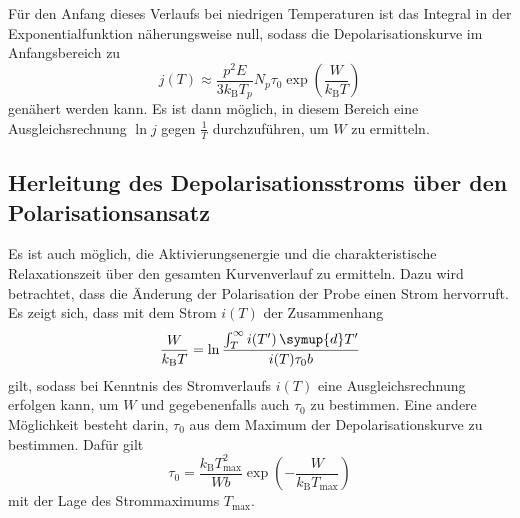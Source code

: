 Für den Anfang dieses Verlaufs bei niedrigen Temperaturen ist das Integral in der Exponentialfunktion näherungsweise null, sodass die Depolarisationskurve im Anfangsbereich zu
\begin{equation}
  j(T) \approx \frac{p^2 E}{3 k_\text{B} T_p} {N_p}{\tau_0}
               \exp\left(\frac{W}{k_{\text{B}}T}\right)
               \label{eqn:naeherung}
\end{equation}
genähert werden kann. Es ist dann möglich, in diesem Bereich eine Ausgleichsrechnung $\ln j$ gegen $\frac{1}{T}$ durchzuführen, um $W$ zu ermitteln.

\subsection{Herleitung des Depolarisationsstroms über den Polarisationsansatz}

Es ist auch möglich, die Aktivierungsenergie und die charakteristische Relaxationszeit über den gesamten Kurvenverlauf zu ermitteln. Dazu wird betrachtet, dass die Änderung der Polarisation der Probe einen Strom hervorruft.
Es zeigt sich, dass mit dem Strom $i(T)$ der Zusammenhang
\begin{equation}
  \frac{W}{k_\text{B}T} = \ln \frac{\int_T^\infty i(T')\,\symup{d}T'}{i(T) \tau_0 b}
  \label{eqn:polAnsatz}
\end{equation}
gilt, sodass bei Kenntnis des Stromverlaufs $i(T)$ eine Ausgleichsrechnung erfolgen kann, um $W$ und gegebenenfalls auch $\tau_0$ zu bestimmen.
Eine andere Möglichkeit besteht darin, $\tau_0$ aus dem Maximum der Depolarisationskurve zu bestimmen. Dafür gilt
\begin{equation}
  \tau_0 = \frac{k_\text{B}T_{\text{max}}^2}{Wb}\exp\left(-\frac{W}{k_\text{B}T_\text{max}}\right)
\end{equation}
mit der Lage des Strommaximums $T_\text{max}$.
